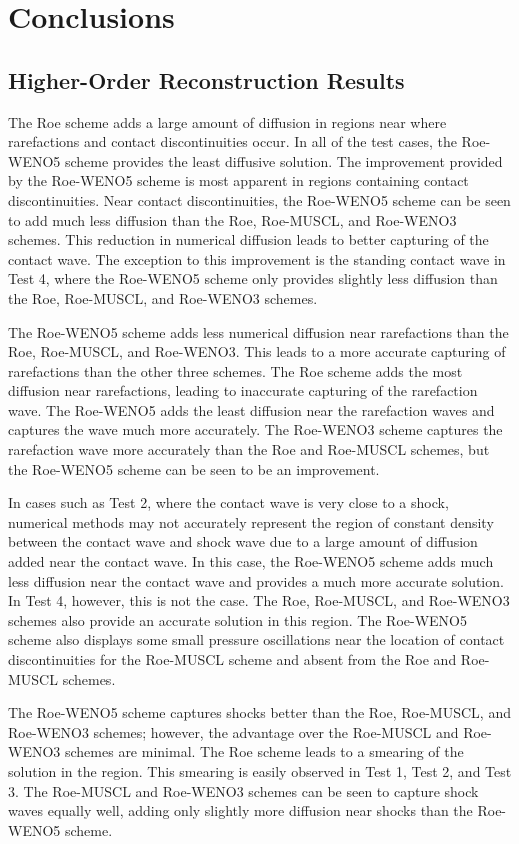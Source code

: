 \chapter{Conclusions}
\label{ch:thisChapterLabel}
\section{Higher-Order Reconstruction Results}

The Roe scheme adds a large amount of diffusion in regions near where rarefactions and contact discontinuities occur. In all of the test cases, the Roe-WENO5 scheme provides the least diffusive solution. The improvement provided by the Roe-WENO5 scheme is most apparent in regions containing contact discontinuities. Near contact discontinuities, the Roe-WENO5 scheme can be seen to add much less diffusion than the Roe, Roe-MUSCL, and Roe-WENO3 schemes. This reduction in numerical diffusion leads to better capturing of the contact wave. The exception to this improvement is the standing contact wave in Test 4, where the Roe-WENO5 scheme only provides slightly less diffusion than the Roe, Roe-MUSCL, and Roe-WENO3 schemes.

The Roe-WENO5 scheme adds less numerical diffusion near rarefactions than the Roe, Roe-MUSCL, and Roe-WENO3. This leads to a more accurate capturing of rarefactions than the other three schemes. The Roe scheme adds the most diffusion near rarefactions, leading to inaccurate capturing of the rarefaction wave. The Roe-WENO5 adds the least diffusion near the rarefaction waves and captures the wave much more accurately. The Roe-WENO3 scheme captures the rarefaction wave more accurately than the Roe and Roe-MUSCL schemes, but the Roe-WENO5 scheme can be seen to be an improvement.

In cases such as Test 2, where the contact wave is very close to a shock, numerical methods may not accurately represent the region of constant density between the contact wave and shock wave due to a large amount of diffusion added near the contact wave. In this case, the Roe-WENO5 scheme adds much less diffusion near the contact wave and provides a much more accurate solution. In Test 4, however, this is not the case. The Roe, Roe-MUSCL, and Roe-WENO3 schemes also provide an accurate solution in this region. The Roe-WENO5 scheme also displays some small pressure oscillations near the location of contact discontinuities for the Roe-MUSCL scheme and absent from the Roe and Roe-MUSCL schemes.

The Roe-WENO5 scheme captures shocks better than the Roe, Roe-MUSCL, and Roe-WENO3 schemes; however, the advantage over the Roe-MUSCL and Roe-WENO3 schemes are minimal. The Roe scheme leads to a smearing of the solution in the region. This smearing is easily observed in Test 1, Test 2, and Test 3. The Roe-MUSCL and Roe-WENO3 schemes can be seen to capture shock waves equally well, adding only slightly more diffusion near shocks than the Roe-WENO5 scheme.
